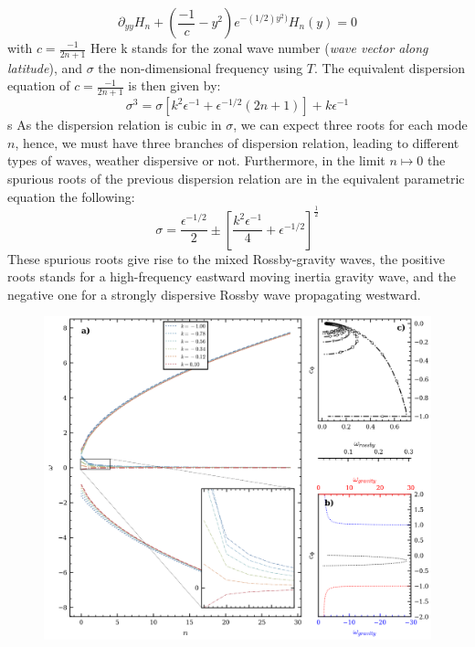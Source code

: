 \documentclass[11pt,a4paper]{report}
\begin{document}
\begin{multicols}{2}
\begin{figure}[H]
    \end{figure}
    $$\partial_{yy} H_n + (\frac{-1}{c} - y^2)e^{-(1/2) y^2)}H_n(y) = 0$$ with $c = \frac{-1}{2n + 1}$
    Here k stands for the zonal wave number (\emph{wave vector along latitude}), and $\sigma$ the non-dimensional frequency using $T$. The equivalent dispersion equation of $c = \frac{-1}{2n + 1}$ is then given by:
    \begin{equation}
        \label{eq:7}
        \sigma^3 = \sigma [k^2 \epsilon^{-1} + \epsilon^{-1/2}(2n + 1)] + k\epsilon^{-1}
    \end{equation}s
    As the dispersion relation is cubic in $\sigma$, we can expect three roots for each mode $n$, hence, we must have three branches of dispersion relation, leading to different types of waves, weather dispersive or not.
    Furthermore, in the limit $n \mapsto 0$ the spurious roots of the previous dispersion relation are in the equivalent parametric equation the following:
    \begin{equation*}
        \sigma = \frac{\epsilon^{-1/2}}{2} \pm \left[\frac{ k^2\epsilon^{-1} }{ 4 } + \epsilon^{-1/2} \right]^{\frac{ 1 }{ 2 } }
    \end{equation*}
    These spurious roots give rise to the mixed Rossby-gravity waves, the positive roots stands for a high-frequency eastward moving inertia
    gravity wave, and the negative one for a strongly dispersive Rossby wave propagating westward.
    \begin{figure}[H]
        \includegraphics[width=\linewidth]{./figure/roots.png}

\end{figure}
\end{multicols}
\end{document}
